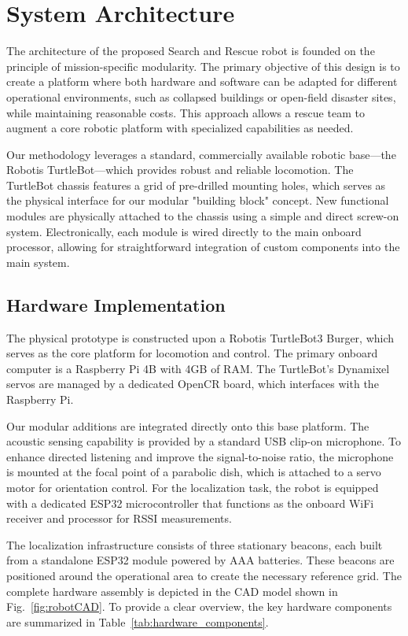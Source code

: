 \section{System Architecture}
The architecture of the proposed Search and Rescue robot is founded on the principle of mission-specific modularity. The primary objective of this design is to create a platform where both hardware and software can be adapted for different operational environments, such as collapsed buildings or open-field disaster sites, while maintaining reasonable costs. This approach allows a rescue team to augment a core robotic platform with specialized capabilities as needed.

Our methodology leverages a standard, commercially available robotic base—the Robotis TurtleBot—which provides robust and reliable locomotion. The TurtleBot chassis features a grid of pre-drilled mounting holes, which serves as the physical interface for our modular "building block" concept. New functional modules are physically attached to the chassis using a simple and direct screw-on system. Electronically, each module is wired directly to the main onboard processor, allowing for straightforward integration of custom components into the main system.

\subsection{Hardware Implementation}
The physical prototype is constructed upon a Robotis TurtleBot3 Burger, which serves as the core platform for locomotion and control. The primary onboard computer is a Raspberry Pi 4B with 4GB of RAM. The TurtleBot's Dynamixel servos are managed by a dedicated OpenCR board, which interfaces with the Raspberry Pi.

Our modular additions are integrated directly onto this base platform. The acoustic sensing capability is provided by a standard USB clip-on microphone. To enhance directed listening and improve the signal-to-noise ratio, the microphone is mounted at the focal point of a parabolic dish, which is attached to a servo motor for orientation control. For the localization task, the robot is equipped with a dedicated ESP32 microcontroller that functions as the onboard WiFi receiver and processor for RSSI measurements.

The localization infrastructure consists of three stationary beacons, each built from a standalone ESP32 module powered by AAA batteries. These beacons are positioned around the operational area to create the necessary reference grid. The complete hardware assembly is depicted in the CAD model shown in Fig.~\ref{fig:robotCAD}. To provide a clear overview, the key hardware components are summarized in Table~\ref{tab:hardware_components}.


